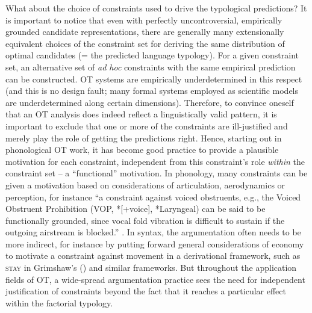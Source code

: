 \documentclass[output=paper,hidelinks]{langscibook}
\begin{document}
What about the choice of constraints used to drive the typological predictions? It is important to notice that even with perfectly uncontroversial, empirically grounded candidate representations, there are generally many extensionally equivalent choices of the constraint set for deriving the same distribution of optimal candidates (= the predicted language typology). For a given constraint set, an alternative set of \emph{ad hoc} constraints with the same empirical prediction can be constructed. OT systems are empirically underdetermined in this respect (and this is no design fault; many formal systems employed as scientific models are underdetermined along certain dimensions). 
Therefore, to convince oneself that an OT analysis does indeed reflect a linguistically valid pattern, it is important to exclude that one or more of the constraints are ill-justified and merely play the role of getting the predictions right. Hence, starting out in phonological OT work, it has become good practice to provide a plausible motivation for each constraint, independent from this constraint's role \emph{within} the constraint set -- a ``functional'' motivation. In phonology, many constraints can be given a motivation based on considerations of articulation, aerodynamics or perception, for instance ``a constraint against voiced obstruents, e.g., the Voiced Obstruent Prohibition (VOP, *[+voice], *Laryngeal) can be said to be functionally grounded, since vocal fold vibration is difficult to sustain if the outgoing airstream is blocked.'' \citep[][sec.~3.2.3]{Kraemer2017}.
In syntax, the argumentation often needs to be more indirect, for instance by putting forward general considerations of economy to motivate a constraint against movement in a derivational framework, such as \textsc{stay} in Grimshaw's (\citeyear{Grimshaw97}) and similar frameworks. But throughout the application fields of OT, a wide-spread argumentation practice sees the need for independent justification of constraints beyond the fact that it reaches a particular effect within the factorial typology.  %
\end{document}
